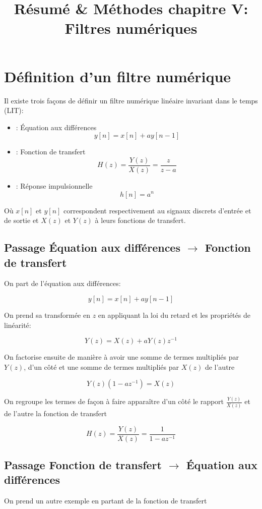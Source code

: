 \documentclass[11pt,a4paper]{article}
\begin{document}
\title{Résumé \& Méthodes chapitre V: Filtres numériques}
\maketitle

\section{Définition d'un filtre numérique}
Il existe trois façons de définir un filtre numérique linéaire invariant dans le temps (LIT):
\begin{itemize}
\item : \'Equation aux différences \[ y[n] = x[n] + a y[n-1]\]
\item : Fonction de transfert \[ H(z) = \frac{Y(z)}{X(z)} = \frac{z}{z-a} \]
\item : Réponse impulsionnelle \[ h[n] = a^{n} \]
\end{itemize}
Où $x[n]$ et $y[n]$ correspondent respectivement au signaux discrets d'entrée et de sortie et $X(z)$ et $Y(z)$ à leurs fonctions de transfert.


\subsection{Passage \'Equation aux différences  $\rightarrow$ Fonction de transfert}
On part de l'équation aux différences:

 \[ y[n] = x[n] + a y[n-1]\] 
 
On prend sa transformée en $z$ en appliquant la loi du retard et les propriétés de linéarité:

\[ Y(z) = X(z) + aY(z)z^{-1}   \]

On factorise ensuite de manière à avoir une somme de termes multipliés par $Y(z)$, d'un côté et une somme de termes multipliés par $X(z)$ de l'autre

\[ Y(z)(1 - az^{-1}) = X(z)    \]

On regroupe les termes de façon à faire apparaître d'un côté le rapport $\frac{Y(z)}{X(z)}$ et de l'autre la fonction de transfert

\[ \boxed {H(z) =  \frac{Y(z)}{X(z)} = \frac{1}{1-az^{-1}}}    \]

\subsection{Passage Fonction de transfert $\rightarrow$ \'Equation aux différences}
On prend un autre exemple en partant de la fonction de transfert 
\end{document}
